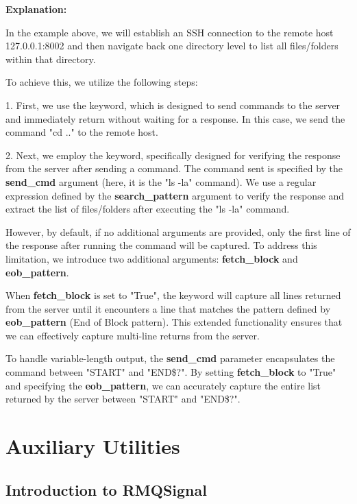 \textbf{Explanation:}

In the example above, we will establish an SSH connection to the remote host 127.0.0.1:8002 and then navigate back one directory level to list all files/folders within that directory.

To achieve this, we utilize the following steps:

1. First, we use the  keyword, which is designed to send commands to the server and immediately return without waiting for a response. In this case, we send the command "cd .." to the remote host.

2. Next, we employ the  keyword, specifically designed for verifying the response from the server after sending a command. The command sent is specified by the \textbf{send\_cmd} argument (here, it is the "ls -la" command). We use a regular expression defined by the \textbf{search\_pattern} argument to verify the response and extract the list of files/folders after executing the "ls -la" command.

However, by default, if no additional arguments are provided, only the first line of the response after running the command will be captured. To address this limitation, we introduce two additional arguments: \textbf{fetch\_block} and \textbf{eob\_pattern}.

When \textbf{fetch\_block} is set to "True", the  keyword will capture all lines returned from the server until it encounters a line that matches the pattern defined by \textbf{eob\_pattern} (End of Block pattern). This extended functionality ensures that we can effectively capture multi-line returns from the server.

To handle variable-length output, the \textbf{send\_cmd} parameter encapsulates the command between "START" and "END\$?". By setting \textbf{fetch\_block} to "True" and specifying the \textbf{eob\_pattern}, we can accurately capture the entire list returned by the server between "START" and "END\$?".


\hypertarget{auxiliary-utilities}{%
\section{Auxiliary Utilities}\label{auxiliary-utilities}}
\subsection{Introduction to RMQSignal}
\label{subsec:auxiliary-intro}

